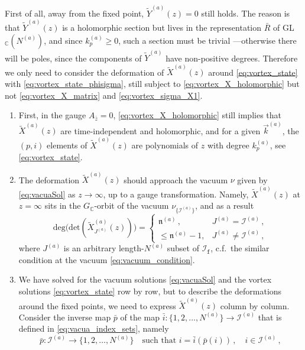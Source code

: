 \documentclass[12pt,a4paper]{article}
\newcommand{\nn}{\mathfrak{n}}
\renewcommand{\(}{\left(}
\renewcommand{\)}{\right)}
\renewcommand{\(}{\left(}
\renewcommand{\)}{\right)}
\begin{document}
First of all, away from the fixed point, $\tilde{Y}^{(a)}(z)=0$ still holds.
The reason is that  $\tilde{Y}^{(a)}(z)$ is a holomorphic section but lives in the representation $\bar{R}$ of GL$_{\mathbb{C}}(N^{(a)})$, and since $k^{(a)}_p\geq 0$, such a section must be trivial ---otherwise there will be poles, since the components of $\tilde{Y}^{(a)}$ have non-positive degrees.
Therefore we only need to consider the deformation of $\tilde{X}^{(a)}(z)$ around \eqref{eq:vortex_state} with \eqref{eq:vortex_state_phisigma}, still subject to \eqref{eq:vortex_X_holomorphic} but not \eqref{eq:vortex_X_matrix} and \eqref{eq:vortex_sigma_X1}.
\begin{enumerate}
\item First, in the gauge $A_{\bar{z}}=0$,  \eqref{eq:vortex_X_holomorphic} still implies that $\tilde{X}^{(a)}(z)$ are time-independent and holomorphic, and for a given $\vec{k}^{(a)}$, the $(p,i)$ elements of $\tilde{X}^{(a)}(z)$ are polynomials of $z$ with degree $k^{(a)}_p$, see \eqref{eq:vortex_state}.
\item The deformation $\tilde{X}^{(a)}(z)$ should approach the vacuum $\nu$ given by \eqref{eq:vacuaSol}
as $z\rightarrow \infty$, up to a gauge transformation.
Namely, $\tilde{X}^{(a)}(z)$ at $z=\infty$ sits in the $G_{\mathbb{C}}$-orbit of the vacuum $\nu_{\{\mathcal{I}^{(a)}\}}$, and as a result
\begin{equation}\label{eq:vacuum_condition_z}
\text{deg(}\text{det}(\tilde{X}^{(a)}_{J^{(a)}}(z)))=
\left\{
\begin{array}{lc}
\nn^{(a)}\,,   & J^{(a)}=\mathcal{I}^{(a)}\,, \\
\leq \nn^{(a)}-1,  & J^{(a)}\neq\mathcal{I}^{(a)}\,,
\end{array}\right.
\end{equation}
where $J^{(a)}$ is an arbitrary length-$N^{(a)}$ subset of $\mathcal{I}_{\mathtt{f}}$, c.f.\ the similar condition at the vacuum \eqref{eq:vacuum_condition}.
\item We have solved for the vacuum solutions \eqref{eq:vacuaSol} and the vortex solutions \eqref{eq:vortex_state} row by row, but to describe the deformations around the fixed points,  we need to express $\tilde{X}^{(a)}(z)$ column by column. 
Consider the inverse map $\bar{p}$ of the map $\bar{i}:\{1,2,\dots,N^{(a)}\}\to\mathcal{I}^{(a)}$ that is defined in \eqref{eq:vacua_index_sets}, namely
\begin{equation}
\bar{p}:\mathcal{I}^{(a)}\to\{1,2,\dots,N^{(a)}\} 
\quad 
\textrm{such that } 
i=\bar{i}(\bar{p}(i))\,,\quad i\in \mathcal{I}^{(a)}\,,

\end{equation}
\end{enumerate}
\end{document}
